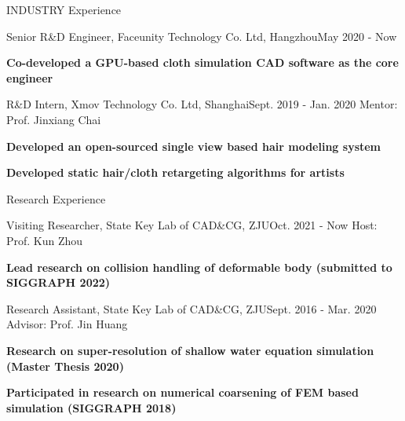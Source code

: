 \documentclass{resume} %
\begin{document}
\begin{rSection}{INDUSTRY Experience}
  \begin{rSubsection}{Senior R\&D Engineer, Faceunity Technology Co. Ltd, Hangzhou}{May 2020 - Now}
    {}{}
\item {\bf Co-developed a GPU-based cloth simulation CAD software as the core engineer}
  \end{rSubsection}
  \begin{rSubsection}{R\&D Intern, Xmov Technology Co. Ltd, Shanghai}{Sept. 2019 - Jan. 2020}
    {Mentor: Prof. Jinxiang Chai}{}
\item {\bf Developed an open-sourced single view based hair modeling system}
\item {\bf Developed static hair/cloth retargeting algorithms for artists} 
  \end{rSubsection}
\end{rSection}

\begin{rSection}{Research Experience}
  \begin{rSubsection}{Visiting Researcher, State Key Lab of CAD\&CG, ZJU}{Oct. 2021 - Now}
    {Host: Prof. Kun Zhou}{}
\item {\bf Lead research on collision handling of deformable body (submitted to SIGGRAPH 2022)}
  \end{rSubsection}  
  \begin{rSubsection}{Research Assistant, State Key Lab of CAD\&CG, ZJU}{Sept. 2016 - Mar. 2020}
    {Advisor: Prof. Jin Huang}{}
  \item {\bf Research on super-resolution of shallow water equation simulation (Master Thesis 2020)}
  \item {\bf Participated in research on numerical coarsening of FEM based simulation (SIGGRAPH 2018)}
  \end{rSubsection}
  
\end{rSection}
\end{document}
